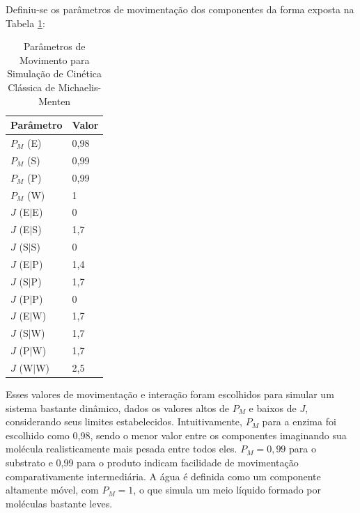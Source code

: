 \documentclass[12pt,oneside]{report}
\begin{document}
Definiu-se os parâmetros de movimentação dos componentes da forma exposta na Tabela \ref{tab:params_movimento}:

\begin{table}[H]
    \centering
    \caption{Parâmetros de Movimento para Simulação de Cinética Clássica de Michaelis-Menten}
    \vspace{0.2cm}
    \begin{tabularx}{\textwidth}{X m{5cm}}
        \hline
        \textbf{Parâmetro} & \textbf{Valor} \\
        \hline
        $P_M$ (E)          & 0{,}98         \\
        $P_M$ (S)          & 0{,}99         \\
        $P_M$ (P)          & 0{,}99         \\
        $P_M$ (W)          & 1              \\
        $J$ (E$|$E)        & 0              \\
        $J$ (E$|$S)        & 1{,}7          \\
        $J$ (S$|$S)        & 0              \\
        $J$ (E$|$P)        & 1{,}4          \\
        $J$ (S$|$P)        & 1{,}7          \\
        $J$ (P$|$P)        & 0              \\
        $J$ (E$|$W)        & 1{,}7          \\
        $J$ (S$|$W)        & 1{,}7          \\
        $J$ (P$|$W)        & 1{,}7          \\
        $J$ (W$|$W)        & 2{,}5          \\
        \hline
    \end{tabularx}
    \vspace{0.2cm}
    \label{tab:params_movimento}
\end{table}

Esses valores de movimentação e interação foram escolhidos para simular um sistema bastante dinâmico, dados os valores altos de $P_M$ e baixos de $J$, considerando seus limites estabelecidos. Intuitivamente, $P_M$ para a enzima foi escolhido como 0{,}98, sendo o menor valor entre os componentes imaginando sua molécula realisticamente mais pesada entre todos eles. $P_M = 0{,}99$ para o substrato e 0{,}99 para o produto indicam facilidade de movimentação comparativamente intermediária. A água é definida como um componente altamente móvel, com $P_M = 1$, o que simula um meio líquido formado por moléculas bastante leves.
\end{document}
